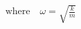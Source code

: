 \documentclass[preview]{standalone}
\begin{document}
\begin{align*}
\quad \text{where} \quad \omega = \sqrt{\frac{k}{m}}
\end{align*}
\end{document}
